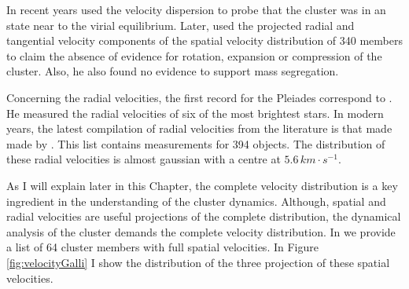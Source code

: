 In recent years \citet{Pinfield1998} used the velocity dispersion to probe that the cluster was in an state near to the virial equilibrium. Later, \citet{2006ARep...50..714L} used the projected radial and tangential velocity components of the spatial velocity distribution of 340 members to claim the absence of evidence for rotation, expansion or compression of the cluster. Also, he also found no evidence to support mass segregation. 

Concerning the radial velocities, the first record for the Pleiades correspond to \citet{1904ApJ....19..338A}. He measured the radial velocities of six of the most brightest stars. In modern years, the latest compilation of radial velocities from the literature is that made made by \citet{Galli2017}. This list contains measurements for 394 objects. The distribution of these radial velocities is almost gaussian with a centre at $5.6\,km \cdot s^{-1}$. 

As I will explain later in this Chapter, the complete velocity distribution is a key ingredient in the understanding of the cluster dynamics. Although, spatial and radial velocities are useful projections of the complete distribution, the dynamical analysis of the cluster demands the complete velocity distribution. In \citet{Galli2017} we provide a list of 64 cluster members with full spatial velocities. In Figure \ref{fig:velocityGalli}  I show the distribution of the three projection of these spatial velocities. 

